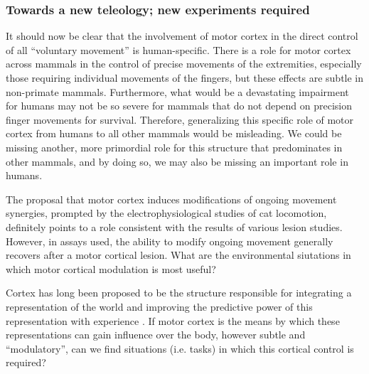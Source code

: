 \subsubsection*{Towards a new teleology; new experiments required}

It should now be clear that the involvement of motor cortex in the direct control of all ``voluntary movement'' is human-specific. There is a role for motor cortex across mammals in the control of precise movements of the extremities, especially those requiring individual movements of the fingers, but these effects are subtle in non-primate mammals. Furthermore, what would be a devastating impairment for humans may not be so severe for mammals that do not depend on precision finger movements for survival. Therefore, generalizing this specific role of motor cortex from humans to all other mammals would be misleading. We could be missing another, more primordial role for this structure that predominates in other mammals, and by doing so, we may also be missing an important role in humans.

The proposal that motor cortex induces modifications of ongoing movement synergies, prompted by the electrophysiological studies of cat locomotion, definitely points to a role consistent with the results of various lesion studies. However, in assays used, the ability to modify ongoing movement generally recovers after a motor cortical lesion. What are the environmental siutations in which motor cortical modulation is most useful?

Cortex has long been proposed to be the structure responsible for integrating a representation of the world and improving the predictive power of this representation with experience \cite{Barlow1985,Doya1999}. If motor cortex is the means by which these representations can gain influence over the body, however subtle and ``modulatory'', can we find situations (i.e. tasks) in which this cortical control is required?

